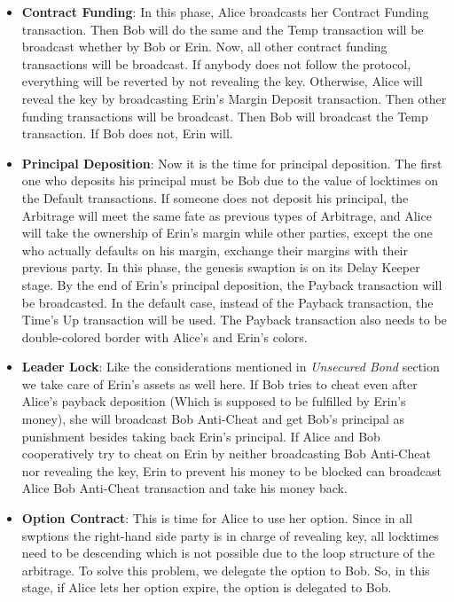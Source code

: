 \begin{itemize}
    \item \textbf{Contract Funding}: In this phase, Alice broadcasts her Contract Funding transaction. Then Bob will do the same and the Temp transaction will be broadcast whether by Bob or Erin. Now, all other contract funding transactions will be broadcast. If anybody does not follow the protocol, everything will be reverted by not revealing the \Aone key. Otherwise, Alice will reveal the \Aone key by broadcasting Erin's Margin Deposit transaction. Then other funding transactions will be broadcast. Then Bob will broadcast the Temp transaction. If Bob does not, Erin will.

    \item \textbf{Principal Deposition}: Now it is the time for principal deposition. The first one who deposits his principal must be Bob due to the value of locktimes on the Default transactions. If someone does not deposit his principal, the Arbitrage will meet the same fate as previous types of Arbitrage, and Alice will take the ownership of Erin's margin while other parties, except the one who actually defaults on his margin, exchange their margins with their previous party. In this phase, the genesis swaption is on its Delay Keeper stage. By the end of Erin's principal deposition, the Payback transaction will be broadcasted. In the default case, instead of the Payback transaction, the Time's Up transaction will be used. The Payback transaction also needs to be double-colored border with Alice's and Erin's colors.
    
    \item \textbf{Leader Lock}: Like the considerations mentioned in {\it Unsecured Bond} section we take care of Erin's assets as well here. If Bob tries to cheat even after Alice's payback deposition (Which is supposed to be fulfilled by Erin's money), she will broadcast Bob Anti-Cheat and get Bob's principal as punishment besides taking back Erin's principal. If Alice and Bob cooperatively try to cheat on Erin by neither broadcasting Bob Anti-Cheat nor revealing the \keyone key, Erin to prevent his money to be blocked can broadcast Alice Bob Anti-Cheat transaction and take his money back.
    
    \item \textbf{Option Contract}: This is time for Alice to use her option. Since in all swptions the right-hand side party is in charge of revealing \Atwo key, all locktimes need to be descending which is not possible due to the loop structure of the arbitrage. To solve this problem, we delegate the option to Bob. So, in this stage, if Alice lets her option expire, the option is delegated to Bob. 
    

\end{itemize}
